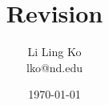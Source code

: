 \documentclass{article}
\begin{document}
\title{Revision}
\author{Li Ling Ko\\ lko@nd.edu}
\date{\today}
\maketitle


%
%
%
\end{document}
